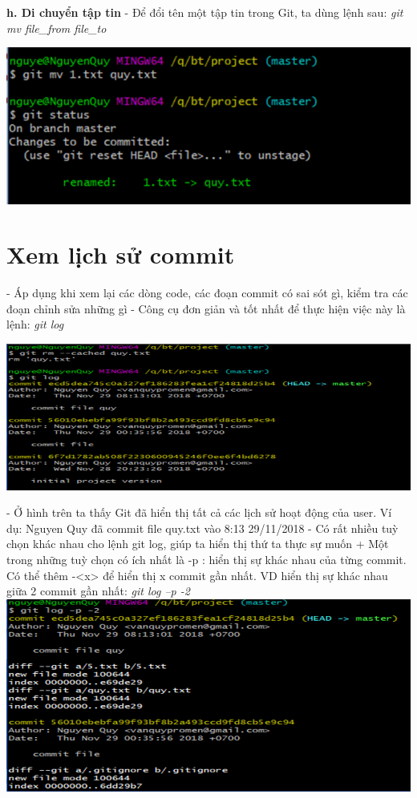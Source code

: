 \documentclass[12pt,a4paper]{report}
\begin{document}
	\label{fig:screenshot015}
\vskip 0.4cm\vskip 0.4cm
{\bf h. Di chuyển tập tin}
- Để đổi tên một tập tin trong Git, ta dùng lệnh sau: {\it git mv file\_from file\_to}\vskip 0.4cm

	\includegraphics[width=0.8\linewidth]{screenshot016}

	\label{fig:screenshot016}




	\newpage
\section{Xem lịch sử commit}
\hspace{0.6cm}- Áp dụng khi xem lại các dòng code, các đoạn commit có sai sót gì, kiểm tra các đoạn chỉnh sửa những gì\vskip 0.4cm
- Công cụ đơn giản và tốt nhất để thực hiện việc này là lệnh: {\it git log}\vskip 0.4cm

	\includegraphics[width=0.8\linewidth]{screenshot017}

	\label{fig:screenshot017}
\vskip 0.4cm\vskip 0.4cm
- Ở hình trên ta thấy Git đã hiển thị tất cả các lịch sử hoạt động của user. Ví dụ: Nguyen Quy đã commit file quy.txt vào 8:13 29/11/2018\vskip 0.4cm
- Có rất nhiều tuỳ chọn khác nhau cho lệnh git log, giúp ta hiển thị thứ ta thực sự muốn\vskip 0.4cm
+ Một trong những tuỳ chọn có ích nhất là -p : hiển thị sự khác nhau của từng commit. Có thể thêm -<x> để hiển thị x commit gần nhất. VD hiển thị sự khác nhau giữa 2 commit gần nhất: {\it git log –p -2}
\vskip 0.4cm
	\includegraphics[width=0.8\linewidth]{screenshot018}
	
\end{document}
